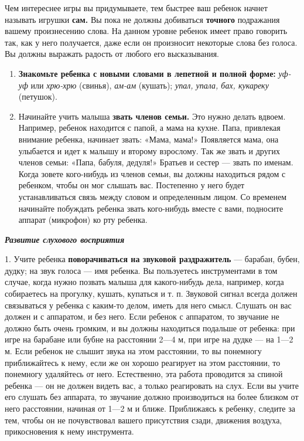 \documentclass[a5paper]{book}
\renewcommand{\emph}[1]{\textit{#1}}
\begin{document}
Чем интереснее игры вы придумываете, тем быстрее ваш ребенок начнет
называть игрушки \textbf{сам.} Вы пока не должны добиваться
\textbf{точного} подражания вашему произнесению слова. На данном уровне
ребенок имеет право говорить так, как у него получается, даже если он
произносит некоторые слова без голоса. Вы должны выражать радость от
любого его высказывания.


\begin{enumerate}
\def\labelenumi{\arabic{enumi}.}
\setcounter{enumi}{2}
\item
  
  \textbf{Знакомьте ребенка с новыми словами в лепетной и полной форме:}
  \emph{уф-уф} или \emph{хрю-хрю} (свинья), \emph{ам-ам} (кушать);
  \emph{упал, упала, бах, кукареку} (петушок).
  
\item
  
  Начинайте учить малыша \textbf{звать членов семьи.} Это нужно делать
  вдвоем. Например, ребенок находится с папой, а мама на кухне. Папа,
  привлекая внимание ребенка, начинает звать: «Мама, мама!» Появляется
  мама, она улыбается и идет к малышу и второму взрослому. Так же звать
  и других членов семьи: «Папа, бабуля, дедуля!» Братьев и сестер ---
  звать по именам. Когда зовете кого-нибудь из членов семьи, вы должны
  находиться рядом с ребенком, чтобы он мог слышать вас. Постепенно у
  него будет устанавливаться связь между словом и определенным лицом. Со
  временем начинайте побуждать ребенка звать кого-нибудь вместе с вами,
  подносите аппарат (микрофон) ко рту ребенка.
  
\end{enumerate}


\emph{\textbf{Развитие слухового восприятия}}

1. Учите ребенка \textbf{поворачиваться на звуковой раздражитель} ---
барабан, бубен, дудку; на звук голоса --- имя ребенка. Вы пользуетесь
инструментами в том случае, когда нужно позвать малыша для какого-нибудь
дела, например, когда собираетесь на прогулку, кушать, купаться и т. п.
Звуковой сигнал всегда должен связываться у ребенка с каким-то делом,
иметь для него смысл. Слушать он вас должен и с аппаратом, и без него.
Если ребенок с аппаратом, то звучание не должно быть очень громким, и вы
должны находиться подальше от ребенка: при игре на барабане или бубне на
расстоянии 2---4 м, при игре на дудке --- на 1---2 м. Если ребенок не
слышит звука на этом расстоянии, то вы понемногу приближайтесь к нему,
если же он хорошо реагирует на этом расстоянии, то понемногу удаляйтесь
от него. Естественно, эта работа проводится за спиной ребенка --- он не
должен видеть вас, а только реагировать на слух. Если вы учите его
слушать без аппарата, то звучание должно производиться на более близком
от него расстоянии, начиная от 1---2 м и ближе. Приближаясь к ребенку,
следите за тем, чтобы он не почувствовал вашего присутствия сзади,
движения воздуха, прикосновения к нему инструмента.
\end{document}

